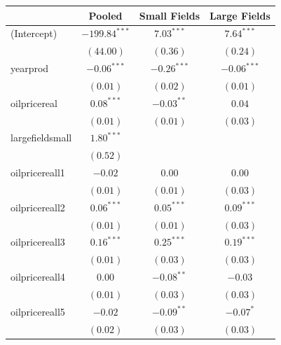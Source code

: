 \documentclass[12pt]{article}
\begin{document}
\begin{table}
\begin{center}
\begin{tabular}{l c c c }
\hline
                                     & Pooled & Small Fields & Large Fields \\
\hline
(Intercept)                          & $-199.84^{***}$ & $7.03^{***}$   & $7.64^{***}$    \\
                                     & $(44.00)$       & $(0.36)$       & $(0.24)$        \\
yearprod                            & $-0.06^{***}$   & $-0.26^{***}$  & $-0.06^{***}$   \\
                                     & $(0.01)$        & $(0.02)$       & $(0.01)$        \\
oilpricereal                       & $0.08^{***}$    & $-0.03^{**}$   & $0.04$          \\
                                     & $(0.01)$        & $(0.01)$       & $(0.03)$        \\
largefieldsmall                     & $1.80^{***}$    &                &                 \\
                                     & $(0.52)$        &                &                 \\
oilpricereall1                    & $-0.02$         & $0.00$         & $0.00$          \\
                                     & $(0.01)$        & $(0.01)$       & $(0.03)$        \\
oilpricereall2                    & $0.06^{***}$    & $0.05^{***}$   & $0.09^{***}$    \\
                                     & $(0.01)$        & $(0.01)$       & $(0.03)$        \\
oilpricereall3                    & $0.16^{***}$    & $0.25^{***}$   & $0.19^{***}$    \\
                                     & $(0.01)$        & $(0.03)$       & $(0.03)$        \\
oilpricereall4                    & $0.00$          & $-0.08^{**}$   & $-0.03$         \\
                                     & $(0.01)$        & $(0.03)$       & $(0.03)$        \\
oilpricereall5                    & $-0.02$         & $-0.09^{**}$   & $-0.07^{*}$     \\
                                     & $(0.02)$        & $(0.03)$       & $(0.03)$        \\

\end{tabular}
\end{center}
\end{table}
\end{document}
